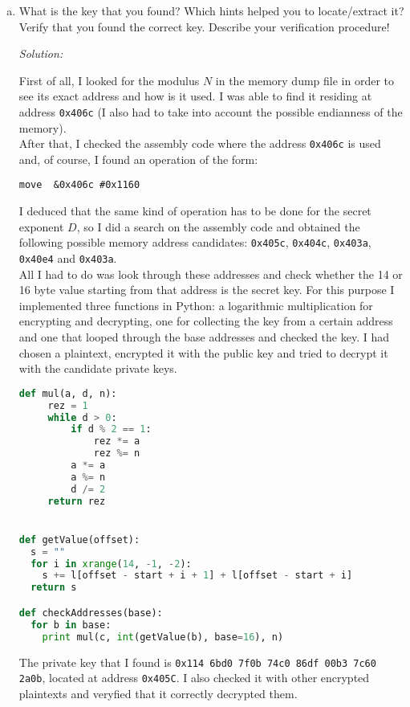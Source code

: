\documentclass[a4paper,11pt]{article}
\newenvironment{solution}%
{\par{\noindent\small\textit{Solution:}}\vspace{-12pt}\begin{framed}}%
{\end{framed}\par}
\begin{document}
\begin{enumerate}[(a)]
\begin{solution}
Using this file format I was able to disassemble it using the package python-msp430-tools,
and obtained the corresponding assembly code.

\end{solution}\fi

\item What is the key that you found? Which hints helped you to
locate/extract it? Verify that you found the correct key. Describe your
verification procedure!
\ifsolution\begin{solution}
First of all, I looked for the modulus $N$ in the memory dump file in order to
see its exact address and how is it used. I was able to find it residing at address
{\tt 0x406c} (I also had to take into account the possible endianness of the memory).\\
After that, I checked the assembly code where the address {\tt 0x406c} is used and, of course,
I found an operation of the form:
\begin{lstlisting}
move  &0x406c #0x1160
\end{lstlisting}

I deduced that the same kind of operation has to be done for the secret exponent $D$, so I
did a search on the assembly code and obtained the following possible memory address candidates:
{\tt 0x405c}, {\tt 0x404c}, {\tt 0x403a}, {\tt 0x40e4} and {\tt 0x403a}.\\
All I had to do was look through these addresses and check whether the 14 or 16 byte value starting
from that address is the secret key. For this purpose I implemented three functions in Python:
a logarithmic multiplication for encrypting and decrypting, one for collecting the key from a certain
address and one that looped through the base addresses and checked the key. I had chosen a plaintext,
encrypted it with the public key and tried to decrypt it with the candidate private keys.\\

\begin{lstlisting}[language=Python]
def mul(a, d, n):
     rez = 1
     while d > 0:
         if d % 2 == 1:
             rez *= a
             rez %= n
         a *= a
         a %= n
         d /= 2
     return rez


def getValue(offset):
  s = ""
  for i in xrange(14, -1, -2):
    s += l[offset - start + i + 1] + l[offset - start + i]
  return s

def checkAddresses(base):
  for b in base:
    print mul(c, int(getValue(b), base=16), n)
\end{lstlisting}

The private key that I found is {\tt 0x114 6bd0 7f0b 74c0 86df 00b3 7c60 2a0b}, located
at address {\tt 0x405C}.
I also checked it with other encrypted plaintexts and veryfied that it correctly
decrypted them.

\end{solution}\fi

\end{enumerate}
\end{document}
